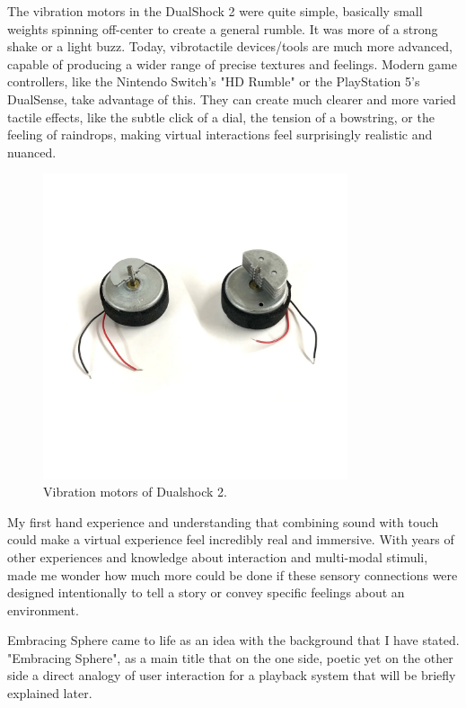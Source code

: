     The vibration motors in the DualShock 2 were quite simple, basically small weights spinning off-center to create a general rumble. It was more of a strong shake or a light buzz\cite{PlayStation_Blogpost}. Today, vibrotactile devices/tools are much more advanced, capable of producing a wider range of precise textures and feelings. Modern game controllers, like the Nintendo Switch's "HD Rumble" or the PlayStation 5's DualSense, take advantage of this. They can create much clearer and more varied tactile effects, like the subtle click of a dial, the tension of a bowstring, or the feeling of raindrops, making virtual interactions feel surprisingly realistic and nuanced.

    \begin{figure}[H]
    \centering
    \includegraphics[width=0.8\textwidth]{images/vibration_motors_ds2.jpg}
    \caption{Vibration motors of Dualshock 2.}
    \end{figure}

    My first hand experience and understanding that combining sound with touch could make a virtual experience feel incredibly real and immersive. With years of other experiences and knowledge about interaction and multi-modal stimuli, made me wonder how much more could be done if these sensory connections were designed intentionally to tell a story or convey specific feelings about an environment.

    Embracing Sphere came to life as an idea with the background that I have stated. "Embracing Sphere", as a main title that on the one side, poetic yet on the other side a direct analogy of user interaction for a playback system that will be briefly explained later. 
    
